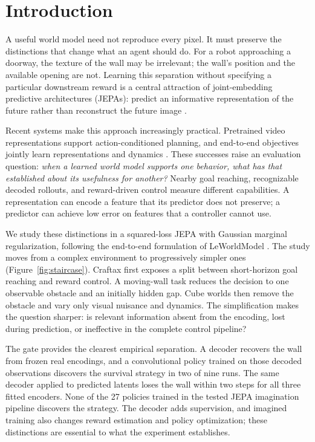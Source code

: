 \section{Introduction}
\label{sec:intro}

A useful world model need not reproduce every pixel. It must preserve the distinctions that change
what an agent should do. For a robot approaching a doorway, the texture of the wall may be irrelevant;
the wall's position and the available opening are not. Learning this separation without specifying a
particular downstream reward is a central attraction of joint-embedding predictive architectures
(JEPAs): predict an informative representation of the future rather than reconstruct the future
image \citep{lecun2022path,assran2023ijepa,bardes2024vjepa}.

Recent systems make this approach increasingly practical. Pretrained video representations support
action-conditioned planning, and end-to-end objectives jointly learn representations and dynamics
\citep{assran2025vjepa2,sobal2025pldm,maes2026lewm}. These successes raise an evaluation question:
\emph{when a learned world model supports one behavior, what has that established about its usefulness
for another?} Nearby goal reaching, recognizable decoded rollouts, and reward-driven control measure
different capabilities. A representation can encode a feature that its predictor does not preserve;
a predictor can achieve low error on features that a controller cannot use.

We study these distinctions in a squared-loss JEPA with Gaussian marginal regularization, following
the end-to-end formulation of LeWorldModel \citep{maes2026lewm,balestriero2025lejepa}. The study moves
from a complex environment to progressively simpler ones (Figure~\ref{fig:staircase}). Craftax first
exposes a split between short-horizon goal reaching and reward control. A moving-wall task reduces
the decision to one observable obstacle and an initially hidden gap. Cube worlds then remove the
obstacle and vary only visual nuisance and dynamics. The simplification makes the question sharper:
is relevant information absent from the encoding, lost during prediction, or ineffective in the
complete control pipeline?

The gate provides the clearest empirical separation. A decoder recovers the wall from frozen real
encodings, and a convolutional policy trained on those decoded observations discovers the survival
strategy in two of nine runs. The same decoder applied to predicted latents loses the wall within
two steps for all three fitted encoders. None of the 27 policies trained in the tested JEPA
imagination pipeline discovers the strategy. The decoder adds supervision, and imagined training
also changes reward estimation and policy optimization; these distinctions are essential to what
the experiment establishes.

